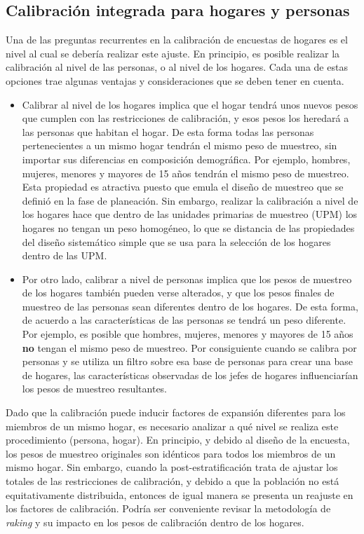 \documentclass[
  12pt,
]{book}
\begin{document}
\hypertarget{calibraciuxf3n-integrada-para-hogares-y-personas}{%
\subsection{Calibración integrada para hogares y personas}\label{calibraciuxf3n-integrada-para-hogares-y-personas}}

Una de las preguntas recurrentes en la calibración de encuestas de hogares es el nivel al cual se debería realizar este ajuste. En principio, es posible realizar la calibración al nivel de las personas, o al nivel de los hogares. Cada una de estas opciones trae algunas ventajas y consideraciones que se deben tener en cuenta.

\begin{itemize}
\item
  Calibrar al nivel de los hogares implica que el hogar tendrá unos nuevos pesos que cumplen con las restricciones de calibración, y esos pesos los heredará a las personas que habitan el hogar. De esta forma todas las personas pertenecientes a un mismo hogar tendrán el mismo peso de muestreo, sin importar sus diferencias en composición demográfica. Por ejemplo, hombres, mujeres, menores y mayores de 15 años tendrán el mismo peso de muestreo. Esta propiedad es atractiva puesto que emula el diseño de muestreo que se definió en la fase de planeación. Sin embargo, realizar la calibración a nivel de los hogares hace que dentro de las unidades primarias de muestreo (UPM) los hogares no tengan un peso homogéneo, lo que se distancia de las propiedades del diseño sistemático simple que se usa para la selección de los hogares dentro de las UPM.
\item
  Por otro lado, calibrar a nivel de personas implica que los pesos de muestreo de los hogares también pueden verse alterados, y que los pesos finales de muestreo de las personas sean diferentes dentro de los hogares. De esta forma, de acuerdo a las características de las personas se tendrá un peso diferente. Por ejemplo, es posible que hombres, mujeres, menores y mayores de 15 años \textbf{no} tengan el mismo peso de muestreo. Por consiguiente cuando se calibra por personas y se utiliza un filtro sobre esa base de personas para crear una base de hogares, las características observadas de los jefes de hogares influenciarían los pesos de muestreo resultantes.
\end{itemize}

Dado que la calibración puede inducir factores de expansión diferentes para los miembros de un mismo hogar, es necesario analizar a qué nivel se realiza este procedimiento (persona, hogar). En principio, y debido al diseño de la encuesta, los pesos de muestreo originales son idénticos para todos los miembros de un mismo hogar. Sin embargo, cuando la post-estratificación trata de ajustar los totales de las restricciones de calibración, y debido a que la población no está equitativamente distribuida, entonces de igual manera se presenta un reajuste en los factores de calibración. Podría ser conveniente revisar la metodología de \emph{raking} y su impacto en los pesos de calibración dentro de los hogares.
\end{document}
